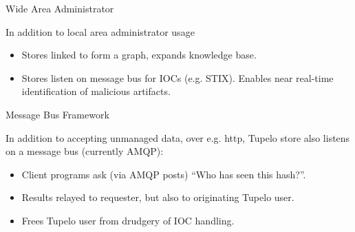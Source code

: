 \documentclass{beamer}
\begin{document}

\begin{frame}{Wide Area Administrator}

In addition to local area administrator usage

\begin{itemize}
\item
Stores linked to form a graph, expands knowledge base.

\item
Stores listen on message bus for IOCs (e.g. STIX).  Enables near
real-time identification of malicious artifacts.

\end{itemize}

\end{frame}


\begin{frame}{Message Bus Framework}

In addition to accepting unmanaged data, over e.g. http, Tupelo store
also listens on a message bus (currently AMQP):

\begin{itemize}
\item
Client programs ask (via AMQP posts) ``Who has seen this hash?''.

\item
Results relayed to requester, but also to originating Tupelo user.

\item
Frees Tupelo user from drudgery of IOC handling.

\end{itemize}

\end{frame}


\end{document}
